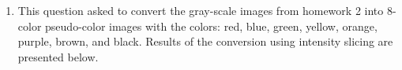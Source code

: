 \documentclass{article}[12 pt]
\begin{document}
\begin{enumerate}

\item This question asked to convert the gray-scale images from homework 2 into 8-color pseudo-color images with the colors: red, blue, green, yellow, orange, purple, brown, and black.  Results of the conversion using intensity slicing are presented below.


\end{enumerate}
\end{document}
